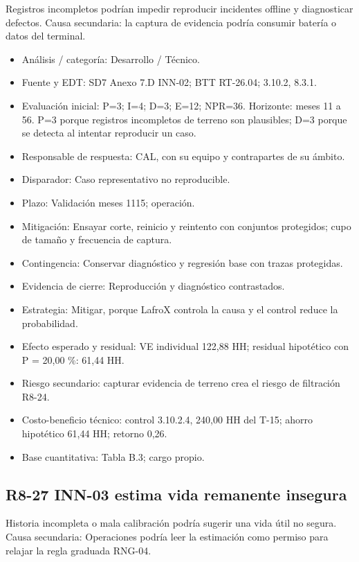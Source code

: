 Registros incompletos podrían impedir reproducir incidentes offline y diagnosticar defectos. Causa secundaria: la captura de evidencia podría consumir batería o datos del terminal.

\begin{itemize}[leftmargin=*,itemsep=3pt]
\item Análisis / categoría: Desarrollo / Técnico.
\item Fuente y EDT: SD7 Anexo 7.D INN-02; BTT RT-26.04; 3.10.2, 8.3.1.
\item Evaluación inicial: P=3; I=4; D=3; E=12; NPR=36. Horizonte: meses 11 a 56. P=3 porque registros incompletos de terreno son plausibles; D=3 porque se detecta al intentar reproducir un caso.
\item Responsable de respuesta: CAL, con su equipo y contrapartes de su ámbito.
\item Disparador: Caso representativo no reproducible.
\item Plazo: Validación meses 11\textendash{}15; operación.
\item Mitigación: Ensayar corte, reinicio y reintento con conjuntos protegidos; cupo de tamaño y frecuencia de captura.
\item Contingencia: Conservar diagnóstico y regresión base con trazas protegidas.
\item Evidencia de cierre: Reproducción y diagnóstico contrastados.
\item Estrategia: Mitigar, porque LafroX controla la causa y el control reduce la probabilidad.
\item Efecto esperado y residual: VE individual 122,88 HH; residual hipotético con P = 20,00 \%: 61,44 HH.
\item Riesgo secundario: capturar evidencia de terreno crea el riesgo de filtración R8-24.
\item Costo-beneficio técnico: control 3.10.2.4, 240,00 HH del T-15; ahorro hipotético 61,44 HH; retorno 0,26.
\item Base cuantitativa: Tabla B.3; cargo propio.
\end{itemize}

\subsection*{R8-27 \textemdash{} INN-03 estima vida remanente insegura}

Historia incompleta o mala calibración podría sugerir una vida útil no segura. Causa secundaria: Operaciones podría leer la estimación como permiso para relajar la regla graduada RNG-04.


